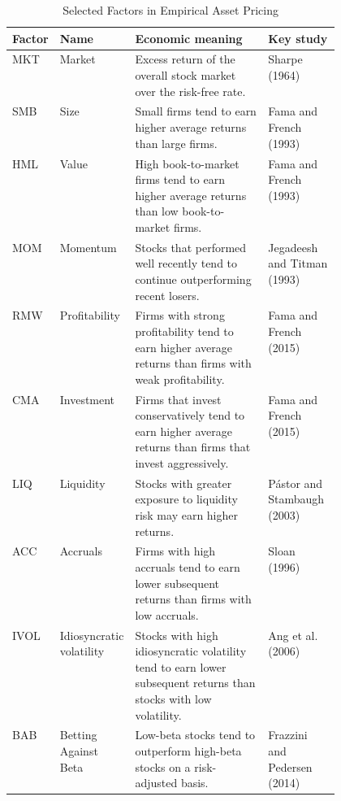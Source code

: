 \begingroup
\small
\setlength{\LTpre}{6pt}\setlength{\LTpost}{6pt}
\begin{longtable}{>{\raggedright\arraybackslash}p{0.08\linewidth}>{\raggedright\arraybackslash}p{0.17\linewidth}p{}>{\raggedright\arraybackslash}p{0.22\linewidth}}
\caption{Selected Factors in Empirical Asset Pricing}
\label{tab:04-factor-zoo} \\
\hline
\textbf{Factor} & \textbf{Name} & \textbf{Economic meaning} & \textbf{Key study} \\
\hline
MKT & Market
& Excess return of the overall stock market over the risk-free rate.
& Sharpe (1964) \\

SMB & Size
& Small firms tend to earn higher average returns than large firms.
& Fama and French (1993) \\

HML & Value
& High book-to-market firms tend to earn higher average returns than low book-to-market firms.
& Fama and French (1993) \\

MOM & Momentum
& Stocks that performed well recently tend to continue outperforming recent losers.
& Jegadeesh and Titman (1993) \\

RMW & Profitability
& Firms with strong profitability tend to earn higher average returns than firms with weak profitability.
& Fama and French (2015) \\

CMA & Investment
& Firms that invest conservatively tend to earn higher average returns than firms that invest aggressively.
& Fama and French (2015) \\

LIQ & Liquidity
& Stocks with greater exposure to liquidity risk may earn higher returns.
& Pástor and Stambaugh (2003) \\

ACC & Accruals
& Firms with high accruals tend to earn lower subsequent returns than firms with low accruals.
& Sloan (1996) \\

IVOL & Idiosyncratic volatility
& Stocks with high idiosyncratic volatility tend to earn lower subsequent returns than stocks with low volatility.
& Ang et al. (2006) \\

BAB & Betting Against Beta
& Low-beta stocks tend to outperform high-beta stocks on a risk-adjusted basis.
& Frazzini and Pedersen (2014) \\
\hline
\end{longtable}
\endgroup

